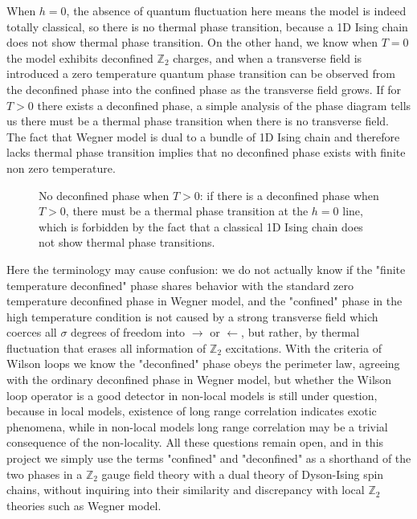 \documentclass[hyperref, a4paper]{article}
\begin{document}
When $h = 0$, the absence of quantum fluctuation here means the model is indeed totally classical, so there is no thermal phase transition, because a 1D Ising chain does not show thermal phase transition.
On the other hand, we know when $T=0$ the model exhibits deconfined $\mathbb{Z}_2$ charges, and when a transverse field is introduced a zero temperature quantum phase transition can be observed from the deconfined phase into the confined phase as the transverse field grows.
If for $T > 0$ there exists a deconfined phase, a simple analysis of the phase diagram tells us there must be a thermal phase transition when there is no transverse field.
The fact that Wegner model is dual to a bundle of 1D Ising chain and therefore lacks thermal phase transition implies that no deconfined phase exists with finite non zero temperature.

\begin{figure}
    \centering
    
    \caption{No deconfined phase when $T > 0$: if there is a deconfined phase when $T > 0$, there must be a thermal phase transition at the $h=0$ line, which is forbidden by the fact that a classical 1D Ising chain does not show thermal phase transitions.}
\end{figure}

Here the terminology may cause confusion: we do not actually know if the "finite temperature deconfined" phase shares behavior with the standard zero temperature deconfined phase in Wegner model, and the "confined" phase in the high temperature condition is not caused by a strong transverse field which coerces all $\sigma$ degrees of freedom into $\rightarrow$ or $\leftarrow$, but rather, by thermal fluctuation that erases all information of $\mathbb{Z}_2$ excitations.
With the criteria of Wilson loops we know the "deconfined" phase obeys the perimeter law, agreeing with the ordinary deconfined phase in Wegner model, but whether the Wilson loop operator is a good detector in non-local models is still under question, because in local models, existence of long range correlation indicates exotic phenomena, while in non-local models long range correlation may be a trivial consequence of the non-locality.
All these questions remain open, and in this project we simply use the terms "confined" and "deconfined" as a shorthand of the two phases in a $\mathbb{Z}_2$ gauge field theory with a dual theory of Dyson-Ising spin chains, without inquiring into their similarity and discrepancy with local $\mathbb{Z}_2$ theories such as Wegner model.
\end{document}

